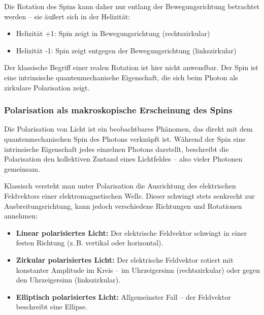 \vspace{0.5em}
Die Rotation des Spins kann daher nur entlang der Bewegungsrichtung betrachtet werden – sie äußert sich in der Helizität:

\begin{itemize}
	\item Helizität +1: Spin zeigt in Bewegungsrichtung (rechtszirkular)
	\item Helizität -1: Spin zeigt entgegen der Bewegungsrichtung (linkszirkular)
\end{itemize}

Der klassische Begriff einer realen Rotation ist hier nicht anwendbar. Der Spin ist eine intrinsische quantenmechanische Eigenschaft, die sich beim Photon als zirkulare Polarisation zeigt.

\subsubsection{Polarisation als makroskopische \newline Erscheinung des Spins}

Die Polarisation von Licht ist ein beobachtbares Phänomen, das direkt mit dem quantenmechanischen Spin des Photons verknüpft ist. Während der Spin eine intrinsische Eigenschaft jedes einzelnen Photons darstellt, beschreibt die Polarisation den kollektiven Zustand eines Lichtfeldes – also vieler Photonen gemeinsam.

\vspace{0.5em}
Klassisch versteht man unter Polarisation die Ausrichtung des elektrischen Feldvektors einer elektromagnetischen Welle. Dieser schwingt stets senkrecht zur Ausbreitungsrichtung, kann jedoch verschiedene Richtungen und Rotationen annehmen:

\begin{itemize}
	\item \textbf{Linear polarisiertes Licht:} Der elektrische Feldvektor schwingt in einer festen Richtung (z.\,B. vertikal oder horizontal).
	\item \textbf{Zirkular polarisiertes Licht:} Der elektrische Feldvektor rotiert mit konstanter Amplitude im Kreis – im Uhrzeigersinn (rechtszirkular) oder gegen den Uhrzeigersinn (linkszirkular).
	\item \textbf{Elliptisch polarisiertes Licht:} Allgemeinster Fall – der Feldvektor beschreibt eine Ellipse.
\end{itemize}

